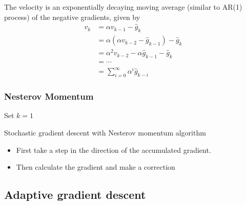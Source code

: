 \begin{refsection}
\begin{remark}
The velocity is an exponentially decaying moving average (similar to AR(1) process) of
the negative gradients, given by
\begin{align*}
v_k &= \alpha v_{k-1} - \hat{g}_k\\
&= \alpha (\alpha v_{k-2} - \hat{g}_{k-1}) - \hat{g}_k \\
&= \alpha^2 v_{k-2} - \alpha \hat{g}_{k-1} - \hat{g}_k \\
&= \cdots \\
&= \sum_{i=0}^\infty  \alpha^{i} \hat{g}_{k-i}
\end{align*}	
\end{remark}




\subsubsection{Nesterov Momentum}
\begin{algorithm}[H]
	\SetAlgoLined
	\KwIn{learning rate $\epsilon_k$, iniital model parameter $\theta$, momentum parameter $\alpha\in [0,1)$, initial velocity $v$}
	Set $k=1$ \\
	\caption{Stochastic gradient descent with Nesterov momentum algorithm}
\end{algorithm}

\begin{remark}\hfill
\begin{itemize}
	\item First take a step in the direction of the
	accumulated gradient.
	\item Then calculate the gradient and make a correction
\end{itemize}	
\end{remark}

\subsection{Adaptive gradient descent}

\end{refsection}
